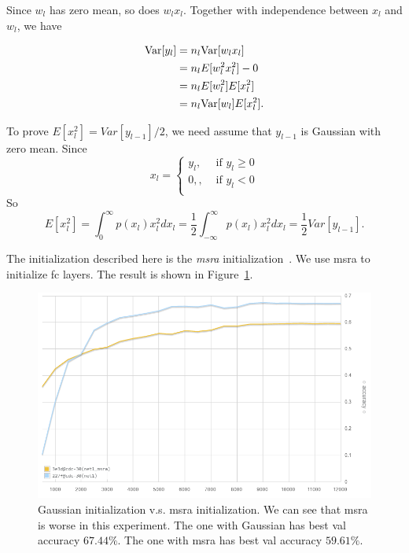 Since $w_l$ has zero mean,
so does $w_l x_l$.
Together with independence between $x_l$ and $w_l$,
we have

\begin{equation}
\begin{split}
    {\mathop{\mathrm{Var}}}[y_l] &= n_l {\mathop{\mathrm{Var}}}[w_l x_l] \\
        &=n_l E[w_l^2 x_l^2] - 0 \\
        &=n_l E[w_l^2] E[x_l^2] \\
        &=n_l {\mathop{\mathrm{Var}}}[w_l] E[x_l^2].
\end{split}
\end{equation}

To prove $E[x_l^2]=Var[y_{l-1}]/2$,
we need assume that $y_{l-1}$ is Gaussian with zero mean.
Since
\begin{equation}
    x_l = \begin{cases}
        y_l, &\text{ if }y_l\ge0\\
        0, , &\text{ if }y_l<0\\
    \end{cases}
\end{equation}
So
\begin{equation}
    E[x_l^2] = \int_0^\infty p(x_l)x_l^2 dx_l
        = \frac{1}{2}\int_{-\infty}^\infty p(x_l)x_l^2 dx_l
        = \frac{1}{2}Var[y_{l-1}].
\end{equation}

The initialization described here is the \emph{msra} initialization~\cite{he2015delving}.
We use msra to initialize fc layers.
The result is shown in Figure~\ref{fig:msra}.

\begin{figure}[ht]
\centering
    \includegraphics[width=0.9\linewidth]{fig/msra}
    \caption{\small
    Gaussian initialization v.s. msra initialization.
    We can see that msra is worse in this experiment.
    The one with Gaussian has best val accuracy $67.44\%$.
    The one with msra has best val accuracy $59.61\%$.}
    \label{fig:msra}
\end{figure}

\subsection{} %

\subsection{} %

